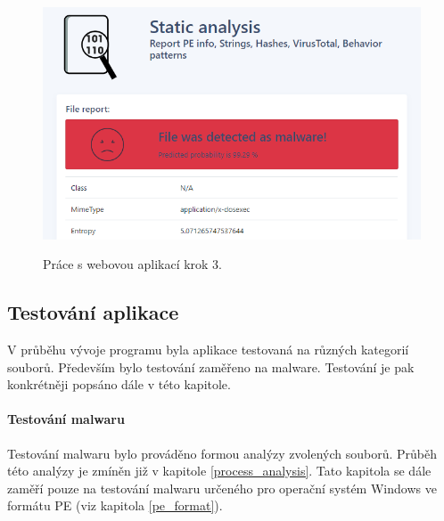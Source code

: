 \begin{figure}[H]
    \caption{Práce s webovou aplikací krok 3.}
    \centering
    \includegraphics[width=135mm,scale=0.5]{Figures/obrazky/web-krok3.png}
    \label{fig:workWithWebApp3}
\end{figure}

\subsection{Testování aplikace}
\label{app_testing}

V průběhu vývoje programu byla aplikace testovaná na různých kategorií souborů. Především bylo testování zaměřeno na malware. Testování je pak konkrétněji popsáno dále v této kapitole.


\paragraph*{Testování malwaru}


Testování malwaru bylo prováděno formou analýzy zvolených souborů. Průběh této analýzy je zmíněn již v kapitole \ref{process_analysis}. Tato kapitola se dále zaměří pouze na testování malwaru určeného pro operační systém Windows ve formátu PE (viz kapitola \ref{pe_format}).

